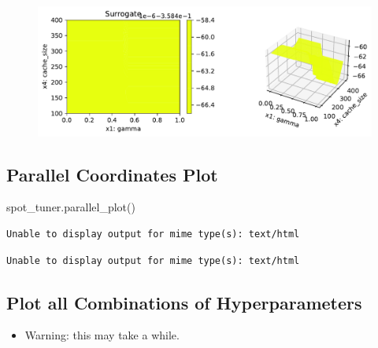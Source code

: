 \documentclass[
  letterpaper,
  DIV=11,
  numbers=noendperiod]{scrreprt}
\newenvironment{Shaded}{\begin{snugshade}}{\end{snugshade}}
\newcommand{\NormalTok}[1]{\textcolor[rgb]{0.00,0.23,0.31}{#1}}
\providecommand{\tightlist}{%
  \setlength{\itemsep}{0pt}\setlength{\parskip}{0pt}}\usepackage{longtable,booktabs,array}
\begin{document}
\begin{figure}[H]

{\centering \includegraphics{18_spot_hpt_sklearn_multiclass_classification_svc_files/figure-pdf/cell-48-output-4.pdf}

}

\end{figure}

\hypertarget{parallel-coordinates-plot-3}{%
\subsection{Parallel Coordinates
Plot}\label{parallel-coordinates-plot-3}}

\begin{Shaded}
\begin{Highlighting}[]
\NormalTok{spot\_tuner.parallel\_plot()}
\end{Highlighting}
\end{Shaded}

\begin{verbatim}
Unable to display output for mime type(s): text/html
\end{verbatim}

\begin{verbatim}
Unable to display output for mime type(s): text/html
\end{verbatim}

\hypertarget{plot-all-combinations-of-hyperparameters-4}{%
\subsection{Plot all Combinations of
Hyperparameters}\label{plot-all-combinations-of-hyperparameters-4}}

\begin{itemize}
\tightlist
\item
  Warning: this may take a while.
\end{itemize}
\end{document}
